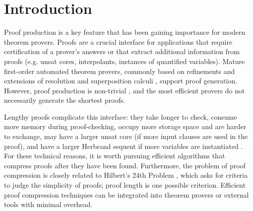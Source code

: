 \section{Introduction} 

Proof production is a key feature that has been gaining importance for modern theorem provers. Proofs are a crucial interface for applications that require certification of a prover's answers or that extract additional information from proofs (e.g. unsat cores, interpolants, instances of quantified variables). Mature first-order automated theorem provers, commonly based on refinements and extensions of resolution and superposition calculi \cite{Vampire,EProver,Spass,spassT,prover9-mace4}, support proof generation. However, proof production is non-trivial \cite{SchulzAPPA}, and the most efficient provers do not necessarily generate the shortest proofs. 





Lengthy proofs complicate this interface: they take longer to check, consume more memory during proof-checking, occupy more storage space and are harder to exchange, may have a larger unsat core (if more input clauses are used in the proof), and have a larger Herbrand sequent if more variables are instantiated \cite{B10,B16,ResolutionHerbrand,Reis}. For these technical reasons, it is worth pursuing efficient algorithms that compress proofs after they have been found. Furthermore, the problem of proof compression is closely related to Hilbert's 24th Problem \cite{Hilbert24Problem}, which asks for criteria to judge the simplicity of proofs; proof length is one possible criterion. 
Efficient proof compression techniques can be integrated into theorem provers or external tools with minimal overhead.

